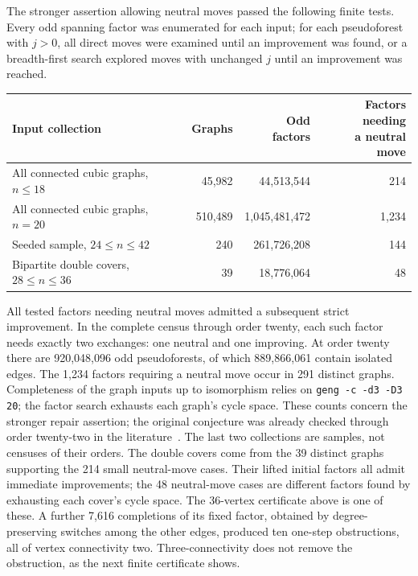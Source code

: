 \documentclass[11pt]{article}
\begin{document}
The stronger assertion allowing neutral moves passed the following
finite tests. Every odd spanning factor was enumerated for each
input; for each pseudoforest with $j>0$, all direct moves were
examined until an improvement was found, or a breadth-first search
explored moves with unchanged $j$ until an improvement was reached.
\begin{center}
\small
\begin{tabular}{lrrr}
\toprule
Input collection & Graphs & Odd factors & \shortstack{Factors needing\\a neutral move}\\
\midrule
All connected cubic graphs, $n\leq18$ &45,982&44,513,544&214\\
All connected cubic graphs, $n=20$ &510,489&1,045,481,472&1,234\\
Seeded sample, $24\leq n\leq42$ &240&261,726,208&144\\
Bipartite double covers, $28\leq n\leq36$ &39&18,776,064&48\\
\bottomrule
\end{tabular}
\end{center}
All tested factors needing neutral moves admitted a subsequent
strict improvement. In the complete census through order twenty,
each such factor needs exactly two exchanges: one neutral and one
improving. At order twenty there are 920,048,096 odd pseudoforests,
of which 889,866,061 contain isolated edges. The 1,234 factors
requiring a neutral move occur in 291 distinct graphs.
Completeness of the graph inputs up to isomorphism relies on
\texttt{geng -c -d3 -D3 20}; the factor search exhausts each graph's
cycle space. These counts concern the stronger repair assertion;
the original conjecture was already checked through order twenty-two
in the literature~\cite{KSS}.
The last two collections are samples, not
censuses of their orders. The double covers come from the 39
distinct graphs supporting the 214 small neutral-move cases.
Their lifted initial factors all admit immediate improvements;
the 48 neutral-move cases are different factors found by exhausting
each cover's cycle space. The 36-vertex certificate above is one
of these. A further 7,616 completions of its fixed factor, obtained
by degree-preserving switches among the other edges, produced
ten one-step obstructions, all of vertex connectivity two.
Three-connectivity does not remove the obstruction, as the next
finite certificate shows.
\end{document}
